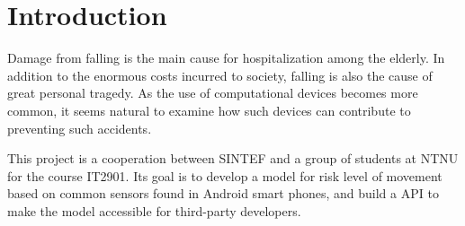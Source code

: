 \chapter{Introduction}
Damage from falling is the main cause for hospitalization among the elderly. In addition to the enormous costs incurred to society, falling is also the cause of great personal tragedy. As the use of computational devices becomes more common, it seems natural to examine how such devices can contribute to preventing such accidents.

This project is a cooperation between SINTEF and a group of students at NTNU for the course IT2901. Its goal is to develop a model for risk level of movement based on common sensors found in Android smart phones, and build a API to make the model accessible for third-party developers.
